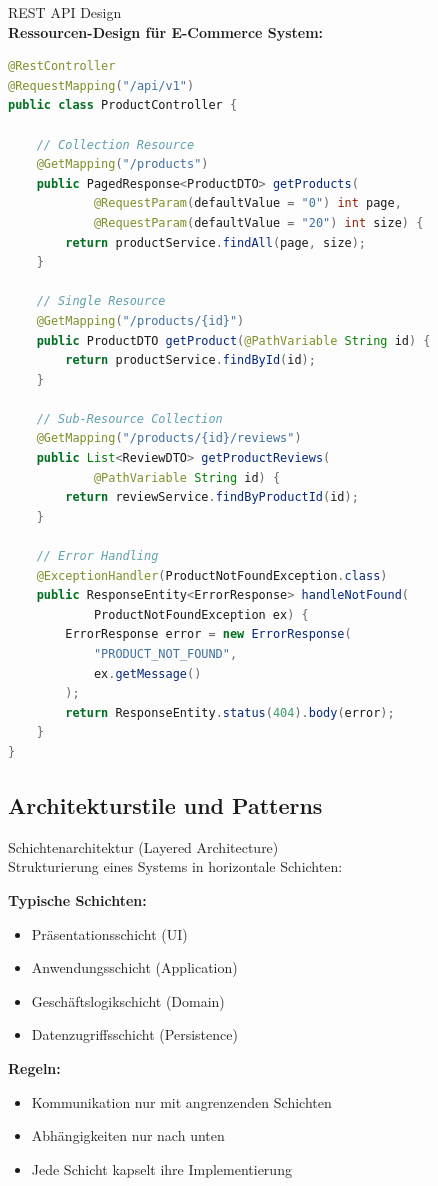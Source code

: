 \begin{example2}{REST API Design}\\
\textbf{Ressourcen-Design für E-Commerce System:}

\begin{lstlisting}[language=Java, style=basesmol]
@RestController
@RequestMapping("/api/v1")
public class ProductController {
    
    // Collection Resource
    @GetMapping("/products")
    public PagedResponse<ProductDTO> getProducts(
            @RequestParam(defaultValue = "0") int page,
            @RequestParam(defaultValue = "20") int size) {
        return productService.findAll(page, size);
    }
    
    // Single Resource
    @GetMapping("/products/{id}")
    public ProductDTO getProduct(@PathVariable String id) {
        return productService.findById(id);
    }
    
    // Sub-Resource Collection
    @GetMapping("/products/{id}/reviews")
    public List<ReviewDTO> getProductReviews(
            @PathVariable String id) {
        return reviewService.findByProductId(id);
    }
    
    // Error Handling
    @ExceptionHandler(ProductNotFoundException.class)
    public ResponseEntity<ErrorResponse> handleNotFound(
            ProductNotFoundException ex) {
        ErrorResponse error = new ErrorResponse(
            "PRODUCT_NOT_FOUND",
            ex.getMessage()
        );
        return ResponseEntity.status(404).body(error);
    }
}
\end{lstlisting}
\end{example2}

\subsection{Architekturstile und Patterns}

\begin{concept}{Schichtenarchitektur (Layered Architecture)}\\
Strukturierung eines Systems in horizontale Schichten:

\textbf{Typische Schichten:}
\begin{itemize}
    \item Präsentationsschicht (UI)
    \item Anwendungsschicht (Application)
    \item Geschäftslogikschicht (Domain)
    \item Datenzugriffsschicht (Persistence)
\end{itemize}

\textbf{Regeln:}
\begin{itemize}
    \item Kommunikation nur mit angrenzenden Schichten
    \item Abhängigkeiten nur nach unten
    \item Jede Schicht kapselt ihre Implementierung
\end{itemize}
\end{concept}

